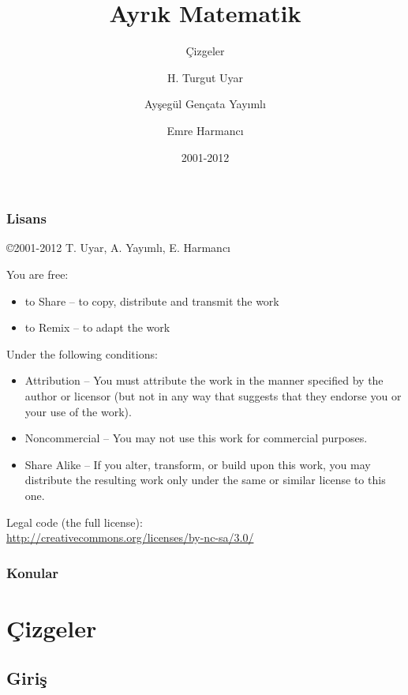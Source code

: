 \documentclass[dvipsnames]{beamer}
\title{Ayrık Matematik}
\subtitle{Çizgeler}
\author{H. Turgut Uyar \and Ayşegül Gençata Yayımlı \and Emre Harmancı}
\date{2001-2012}
\theoremstyle{definition}
\theoremstyle{example}
\theoremstyle{plain}
\begin{document}
\begin{frame}
  \titlepage
\end{frame}

\begin{frame}
  \frametitle{Lisans}

  \hfill
  \copyright 2001-2012 T. Uyar, A. Yayımlı, E. Harmancı

  \vfill
  \begin{tiny}
    You are free:
    \begin{itemize}
      \item to Share -- to copy, distribute and transmit the work
      \item to Remix -- to adapt the work
    \end{itemize}

    Under the following conditions:
    \begin{itemize}
      \item Attribution -- You must attribute the work in the manner specified by
        the author or licensor (but not in any way that suggests that they
        endorse you or your use of the work).

      \item Noncommercial -- You may not use this work for commercial purposes.

      \item Share Alike -- If you alter, transform, or build upon this work, you
        may distribute the resulting work only under the same or similar license
        to this one.
    \end{itemize}
  \end{tiny}

  \vfill
  Legal code (the full license):\\
  \url{http://creativecommons.org/licenses/by-nc-sa/3.0/}
\end{frame}

\begin{frame}
  \frametitle{Konular}
  \tableofcontents
\end{frame}

\section{Çizgeler}

\subsection{Giriş}
\end{document}
